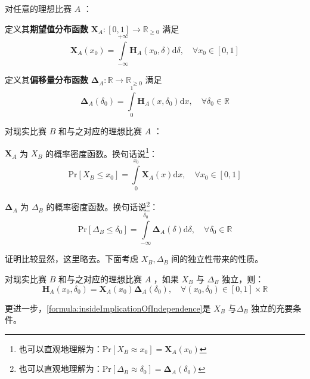             \begin{definition}[期望值分布函数和偏移量分布函数]
                对任意的理想比赛 $A$ ：
                \begin{asparaitem}
                    \item 定义其\textbf{期望值分布函数} $\bm{X}_A:[0,1]\to\mathbb{R}_{\geq 0}$ 满足 $$\bm{X}_A(x_0)=\int\limits_{-\infty}^{+\infty}\bm{H}_A(x_0,\delta)\mathrm{d}\delta,\quad\forall x_0\in[0,1]$$
                    \item 定义其\textbf{偏移量分布函数} $\bm{\Delta}_A:\mathbb{R}\to\mathbb{R}_{\geq 0}$ 满足 $$\bm{\Delta}_A(\delta_0)=\int\limits_0^1\bm{H}_A(x,\delta_0)\mathrm{d}x,\quad\forall\delta_0\in\mathbb{R}$$
                \end{asparaitem}
                \label{def:marginalDistributions}
            \end{definition}

            \begin{proposition}[期望值分布函数和偏移量分布函数的实际含义]
                对现实比赛 $B$ 和与之对应的理想比赛 $A$ ：
                \begin{asparaitem}
                    \item $\bm{X}_A$ 为 $X_B$ 的概率密度函数。换句话说\footnote{也可以直观地理解为：$\mathrm{Pr}[X_B\approx x_0]=\bm{X}_A(x_0)$}：$$\mathrm{Pr}[X_B\leq x_0]=\int\limits_0^{x_0} \bm{X}_A(x)\mathrm{d}x,\quad\forall x_0\in[0,1]$$
                    \item $\bm{\Delta}_A$ 为 $\Delta_B$ 的概率密度函数。换句话说\footnote{也可以直观地理解为：$\mathrm{Pr}[\Delta_B\approx \delta_0]=\bm{\Delta}_A(\delta_0)$}：$$\mathrm{Pr}[\Delta_B\leq \delta_0]=\int\limits_{-\infty}^{\delta_0} \bm{\Delta}_A(\delta)\mathrm{d}\delta,\quad\forall \delta_0\in\mathbb{R}$$
                \end{asparaitem}
                \label{prop:marginalDistributionsMeaning}
            \end{proposition}

            证明比较显然，这里略去。下面考虑 $X_B,\Delta_B$ 间的独立性带来的性质。

            \begin{proposition}
                对现实比赛 $B$ 和与之对应的理想比赛 $A$ ，如果 $X_B$ 与 $\Delta_B$ 独立，则：
                \begin{equation}
                    \bm{H}_A(x_0,\delta_0)=\bm{X}_A(x_0)\bm{\Delta}_A(\delta_0),\quad\forall (x_0,\delta_0)\in[0,1]\times\mathbb{R}
                    \label{formula:insideImplicationOfIndependence}
                \end{equation}

                更进一步，\eqref{formula:insideImplicationOfIndependence}是 $X_B$ 与$\Delta_B$ 独立的充要条件。

                \label{prop:implicationOfIndependence}
            \end{proposition}

